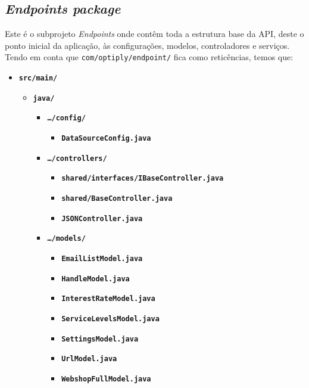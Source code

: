 \newpage

\subsection{\textit{\textit{Endpoints} package}}\label{endp}

Este é o subprojeto \textit{Endpoints} onde contêm toda a estrutura base da API, deste o ponto inicial da aplicação, às configurações, modelos, controladores e serviços. Tendo em conta que \texttt{com/optiply/endpoint/} fica como reticências, temos que:

\begin{itemize}
  \item \texttt{\textbf{src/main/}}\begin{itemize}
          \item \texttt{\textbf{java/}}\begin{itemize}
                  \item \texttt{\textbf{\ldots/config/}}\begin{itemize}
                    \item \texttt{\textbf{DataSourceConfig.java}}
                  \end{itemize}
                  \item \texttt{\textbf{\ldots/controllers/}}\begin{itemize}
                    \item \texttt{\textbf{shared/interfaces/IBaseController.java}}
                    \item \texttt{\textbf{shared/BaseController.java}}
                    \item \texttt{\textbf{JSONController.java}}
                  \end{itemize}
                  \item \texttt{\textbf{\ldots/models/}}\begin{itemize}
                    \item \texttt{\textbf{EmailListModel.java}}
                    \item \texttt{\textbf{HandleModel.java}}
                    \item \texttt{\textbf{InterestRateModel.java}}
                    \item \texttt{\textbf{ServiceLevelsModel.java}}
                    \item \texttt{\textbf{SettingsModel.java}}
                    \item \texttt{\textbf{UrlModel.java}}
                    \item \texttt{\textbf{WebshopFullModel.java}}

\end{itemize}
\end{itemize}
\end{itemize}
\end{itemize}
